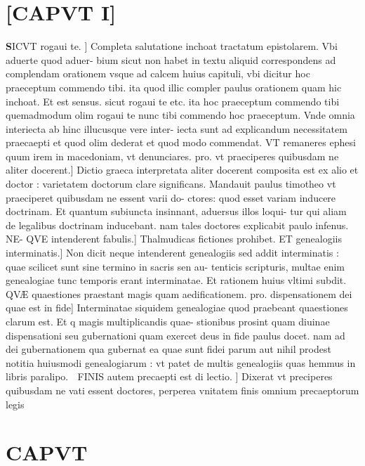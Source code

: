 \documentclass{article}
\begin{document}
\begin{pages}
\section{[CAPVT I]}
\pstart \huge\textbf{S}\normalsize ICVT rogaui te. ] Completa salutatione inchoat tractatum epistolarem. Vbi aduerte quod aduer- bium sicut non habet in textu aliquid correspondens ad complendam orationem vsque ad calcem huius capituli, vbi dicitur hoc praeceptum commendo tibi. ita quod illic compler paulus orationem quam hic inchoat. Et est sensus. sicut rogaui te etc. ita hoc praeceptum commendo tibi quemadmodum olim rogaui te nunc tibi commendo hoc praeceptum. Vnde omnia interiecta ab hinc illucusque vere inter- iecta sunt ad explicandum necessitatem praecaepti et quod olim dederat et quod modo commendat. VT remaneres ephesi quum irem in macedoniam, vt denunciares. pro. vt praeciperes quibusdam ne aliter docerent.] Dictio graeca interpretata aliter docerent composita est ex alio et doctor : varietatem doctorum clare significans. Mandauit paulus timotheo vt praeciperet quibusdam ne essent varii do- ctores: quod esset variam inducere doctrinam. Et quantum subiuncta insinnant, aduersus illos loqui- tur qui aliam de legalibus doctrinam inducebant. nam tales doctores explicabit paulo infenus. NE- QVE intenderent fabulis.] Thalmudicas fictiones prohibet. ET genealogiis interminatis.] Non dicit neque intenderent genealogiis sed addit interminatis : quae scilicet sunt sine termino in sacris sen au- tenticis scripturis, multae enim genealogiae tunc temporis erant interminatae. Et rationem huius vltimi subdit. QVÆ quaestiones praestant magis quam aedificationem. pro. dispensationem dei quae est in fide] Interminatae siquidem genealogiae quod praebeant quaestiones clarum est. Et q magis multiplicandis quae- stionibus prosint quam diuinae dispensationi seu gubernationi quam exercet deus in fide paulus docet. nam ad dei gubernationem qua gubernat ea quae sunt fidei parum aut nihil prodest notitia huiusmodi genealogiarum : vt patet de multis genealogiis quas hemmus in libris paralipo.  FINIS autem precaepti est di lectio. ] Dixerat vt preciperes quibusdam ne vati essent doctores, perperea vnitatem finis omnium precaeptorum legis  \pend
\marginpar{[ p.140 ]}
\section*{CAPVT }

\end{pages}
\end{document}

